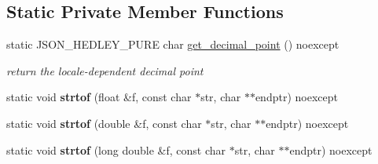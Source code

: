 \subsection*{Static Private Member Functions}
\begin{DoxyCompactItemize}
\item 
\mbox{\label{classnlohmann_1_1detail_1_1lexer_ae90334f30e7c12d5394c116bcfecac19}} 
static J\+S\+O\+N\+\_\+\+H\+E\+D\+L\+E\+Y\+\_\+\+P\+U\+RE char \mbox{\hyperlink{classnlohmann_1_1detail_1_1lexer_ae90334f30e7c12d5394c116bcfecac19}{get\+\_\+decimal\+\_\+point}} () noexcept
\begin{DoxyCompactList}\small\item\em return the locale-\/dependent decimal point \end{DoxyCompactList}\item 
\mbox{\label{classnlohmann_1_1detail_1_1lexer_a1a2d4cc5d9fed4783aa2a98497925511}} 
static void {\bfseries strtof} (float \&f, const char $\ast$str, char $\ast$$\ast$endptr) noexcept
\item 
\mbox{\label{classnlohmann_1_1detail_1_1lexer_a8cd877d10b31bc819e4f030292737ea6}} 
static void {\bfseries strtof} (double \&f, const char $\ast$str, char $\ast$$\ast$endptr) noexcept
\item 
\mbox{\label{classnlohmann_1_1detail_1_1lexer_a0e28dda9a1e007d55d03e8d39dd3b9fa}} 
static void {\bfseries strtof} (long double \&f, const char $\ast$str, char $\ast$$\ast$endptr) noexcept
\end{DoxyCompactItemize}
